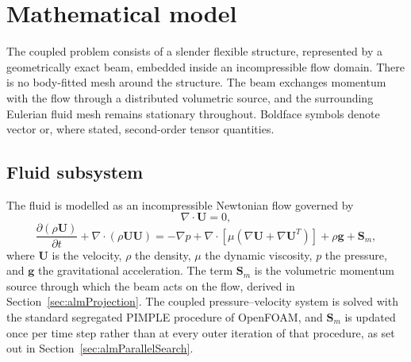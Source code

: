 \section{Mathematical model}
\label{sec:mathmodel}

\noindent
The coupled problem consists of a slender flexible structure, represented by a geometrically exact beam, embedded inside an incompressible flow domain. There is no body-fitted mesh around the structure. The beam exchanges momentum with the flow through a distributed volumetric source, and the surrounding Eulerian fluid mesh remains stationary throughout. Boldface symbols denote vector or, where stated, second-order tensor quantities.

\subsection{Fluid subsystem}
\label{sec:fluidSubsystem}

\noindent
The fluid is modelled as an incompressible Newtonian flow governed by
\begin{equation}
\nabla \cdot \mathbf{U} = 0,
\label{eq:continuity}
\end{equation}
\begin{equation}
\frac{\partial (\rho \mathbf{U})}{\partial t}
+ \nabla \cdot (\rho \mathbf{U}\mathbf{U})
= -\nabla p
+ \nabla \cdot \left[ \mu \left(\nabla \mathbf{U} + \nabla \mathbf{U}^{T}\right)\right]
+ \rho \mathbf{g}
+ \mathbf{S}_{m},
\label{eq:momentum}
\end{equation}
where $\mathbf{U}$ is the velocity, $\rho$ the density, $\mu$ the dynamic viscosity, $p$ the pressure, and $\mathbf{g}$ the gravitational acceleration. The term $\mathbf{S}_{m}$ is the volumetric momentum source through which the beam acts on the flow, derived in Section~\ref{sec:almProjection}. The coupled pressure--velocity system is solved with the standard segregated PIMPLE procedure of OpenFOAM, and $\mathbf{S}_{m}$ is updated once per time step rather than at every outer iteration of that procedure, as set out in Section~\ref{sec:almParallelSearch}.

